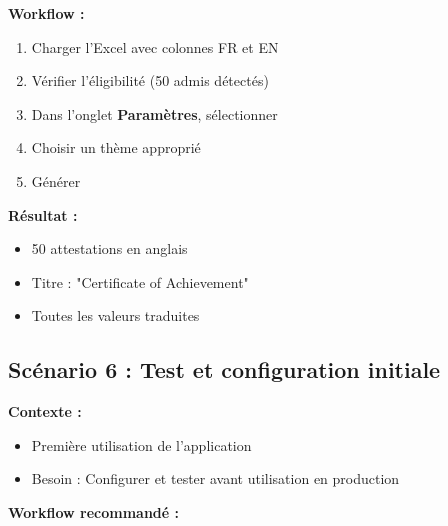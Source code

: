 \textbf{Workflow :}

\begin{enumerate}[leftmargin=*]
    \item Charger l'Excel avec colonnes FR et EN
    \item Vérifier l'éligibilité (50 admis détectés)
    \item Dans l'onglet \textbf{Paramètres}, sélectionner 
    \item Choisir un thème approprié
    \item Générer
\end{enumerate}

\textbf{Résultat :}
\begin{itemize}[leftmargin=*]
    \item 50 attestations en anglais
    \item Titre : "Certificate of Achievement"
    \item Toutes les valeurs traduites
\end{itemize}

\subsection{Scénario 6 : Test et configuration initiale}

\textbf{Contexte :}
\begin{itemize}[leftmargin=*]
    \item Première utilisation de l'application
    \item Besoin : Configurer et tester avant utilisation en production
\end{itemize}

\textbf{Workflow recommandé :}

